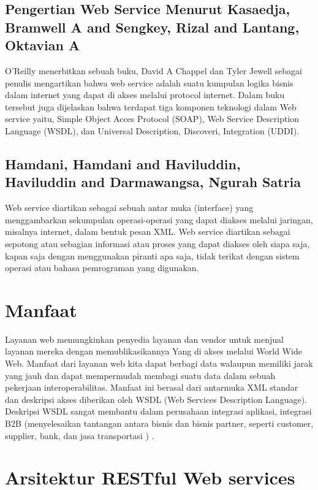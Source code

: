 \documentclass[12pt]{journal}
\begin{document}
\subsection{Pengertian Web Service Menurut Kasaedja, Bramwell A and Sengkey, Rizal and Lantang, Oktavian A}

O’Reilly menerbitkan sebuah buku, David A Chappel dan Tyler Jewell sebagai penulis mengartikan bahwa web service adalah suatu kumpulan logika bisnis dalam internet yang dapat di akses melalui protocol internet. Dalam buku tersebut juga dijelaskan bahwa terdapat tiga komponen teknologi dalam Web service yaitu, Simple Object Acces Protocol (SOAP), Web Service Description Language (WSDL), dan Universal Description, Discoveri, Integration (UDDI)\cite{kasaedja2014rancang}.

\subsection{Hamdani, Hamdani and Haviluddin, Haviluddin and Darmawangsa, Ngurah Satria}

Web service diartikan sebagai sebuah antar muka (interface) yang menggambarkan sekumpulan operasi-operasi yang dapat diakses melalui jaringan, misalnya internet, dalam bentuk pesan XML. Web service diartikan sebagai sepotong atau sebagian informasi atau proses yang dapat diakses oleh siapa saja, kapan saja dengan menggunakan piranti apa saja, tidak terikat dengan sistem operasi atau bahasa pemrograman yang digunakan.



\section{Manfaat}

Layanan web memungkinkan penyedia layanan dan vendor untuk menjual layanan mereka dengan memublikasikannya
Yang di akses melalui World Wide Web.
Manfaat dari layanan web kita dapat berbagi data walaupun memiliki jarak yang jauh dan dapat mempermudah membagi suatu data dalam sebuah pekerjaan
interoperabilitas. Manfaat ini berasal dari antarmuka XML standar dan deskripsi akses
diberikan oleh WSDL (Web Services Description Language). Deskripsi WSDL sangat membantu dalam perusahaan
integrasi aplikasi, integrasi B2B (menyelesaikan tantangan antara bisnis dan bisnis partner, seperti customer, supplier, bank, dan jasa transportasi ) \cite{ferris2003web}.

\section{Arsitektur RESTful Web services}
\end{document}
